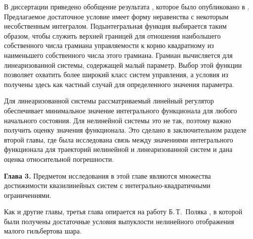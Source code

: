 \documentclass[../main.tex]{subfiles}
\begin{document}
В диссертации приведено обобщение результата \cite{GusevOsipov}, которое было опубликовано в \cite{GusevOsipovMotor}. 
Предлагаемое достаточное условие имеет форму неравенства с некоторым несобственным интегралом.
Подынтегральная функция выбирается таким образом, чтобы служить верхней границей для отношения наибольшего собственного числа грамиана управляемости к корню квадратному из наименьшего собственного числа этого грамиана. 
Грамиан вычисляется для линеаризованной системы, содержащей малый параметр.
Выбор этой функции позволяет охватить более широкий класс систем управления, а условия из \cite{GusevOsipov} получены здесь как частный случай для определенного значения параметра.

Для линеаризованной системы рассматриваемый линейный регулятор обеспечивает минимальное значение интегрального функционала для любого начального состояния. 
Для нелинейной системы это не так, поэтому важно получить оценку значения функционала. 
Это сделано в заключительном разделе второй главы, где была исследована связь между значениями интегрального функционала для траекторий нелинейной и линеаризованной систем и дана оценка относительной погрешности. 

\textbf{Глава 3. }
Предметом исследования в этой главе являются множества достижимости квазилинейных систем с интегрально-квадратичными ограничениями.

Как и другие главы, третья глава опирается на работу Б.\,Т.~Поляка \cite{Polyak2001}, в которой были получены достаточные условия выпуклости нелинейного отображения малого гильбертова шара.
\end{document}
